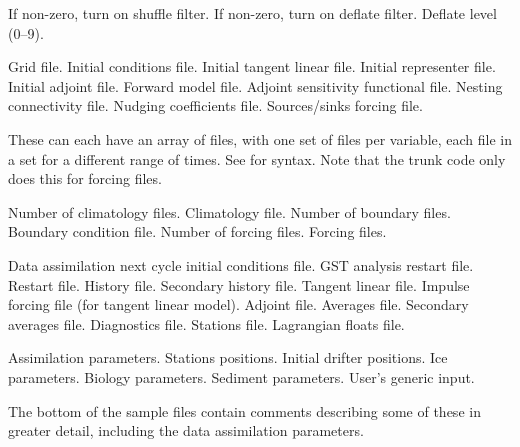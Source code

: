 \begin{klist}
     \begin{klist}
           If non-zero, turn on shuffle filter.
           If non-zero, turn on deflate filter.
           Deflate level (0--9).
     \end{klist}
    \mbox{}
     \begin{klist}
         Grid file.
         Initial conditions file.
         Initial tangent linear file.
         Initial representer file.
         Initial adjoint file.
         Forward model file.
         Adjoint sensitivity functional file.
         Nesting connectivity file.
         Nudging coefficients file.
         Sources/sinks forcing file.
     \end{klist}
     These can
each have an array of files, with one set of files per variable,
each file in a set for a different range of times. See
 for syntax. Note that the trunk code only does this
for forcing files.
     \begin{klist}
         Number of climatology files.
         Climatology file.
         Number of boundary files.
         Boundary condition file.
         Number of forcing files.
         Forcing files.
     \end{klist}
     \mbox{}
     \begin{klist}
         Data assimilation next cycle initial conditions
     file.
         GST analysis restart file.
         Restart file.
         History file.
         Secondary history file.
         Tangent linear file.
         Impulse forcing file (for tangent linear model).
         Adjoint file.
         Averages file.
        Secondary averages file.
         Diagnostics file.
         Stations file.
         Lagrangian floats file.
     \end{klist}
    \mbox{}
     \begin{klist}
         Assimilation parameters.
         Stations positions.
         Initial drifter positions.
         Ice parameters.
         Biology parameters.
         Sediment parameters.
         User's generic input.
     \end{klist}
\end{klist}
The bottom of the sample files contain comments describing some of these in
greater detail, including the data assimilation parameters.

